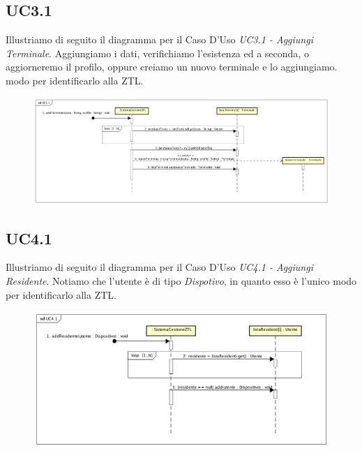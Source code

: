 \documentclass[12pt, letterpaper]{article}
\begin{document}
\subsection{UC3.1}
Illustriamo di seguito il diagramma per il Caso D'Uso 
\emph{UC3.1 - Aggiungi Terminale}. Aggiungiamo i dati,
verifichiamo l'esistenza ed a seconda, o aggiorneremo 
il profilo, oppure creiamo un nuovo terminale e lo 
aggiungiamo.
modo per identificarlo alla ZTL.
\begin{figure}[H]
    \centering
    \includegraphics[scale=0.25]{DI-UC3.1}
    \label{fig:mesh1}
\end{figure}

\subsection{UC4.1}
Illustriamo di seguito il diagramma per il Caso D'Uso 
\emph{UC4.1 - Aggiungi Residente}. Notiamo che l'utente 
è di tipo \emph{Dispotivo}, in quanto esso è l'unico 
modo per identificarlo alla ZTL.
\begin{figure}[H]
    \centering
    \includegraphics[scale=0.40]{DI-UC4.1}
    \label{fig:mesh1}
\end{figure}
\end{document}
